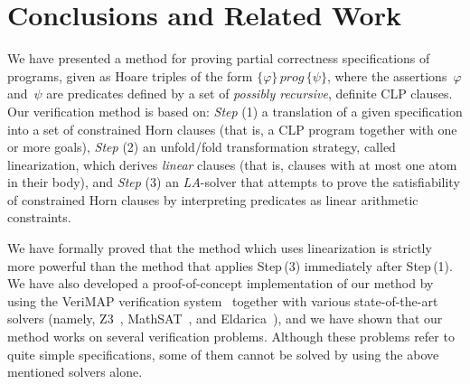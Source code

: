 \documentclass[english]{tlp}
\begin{document}
\begin{table}[ht]
\begin{tabular}
\end{tabular}\vspace{0mm}

\caption{Columns\/ {\rm RI} and {\rm LIN} show the times $($in seconds$)$
 taken for removal of the interpreter and linearization. 
The two columns under \mbox{{\it LA}-{\rm solving-1}} show the times taken by {\rm Z3} and {\rm \hspace{.5mm}Eldarica} for solving the problems after {\rm RI} alone.
The three columns under \mbox{{\it LA}-{\rm solving-2}} show the times taken 
by \mbox{\rm VeriMAP} together with {\rm Z3}, {\rm MathSAT}, {\rm \hspace{.5mm}and Eldarica},  after {\rm RI} and {\rm LIN}.
The timeout TO occurs after $120$ seconds.
\label{tab:expres}}
\end{table}



\section{Conclusions and Related Work}
\label{sec:conclusions}


We have presented a method for proving partial correctness specifications
of programs, given as Hoare triples of the form $\{\varphi\}\, \textit{prog}\, \{\psi\}$,
where the assertions~$\varphi $ and~$\psi$ are predicates
defined by a set of {\it possibly recursive}, definite CLP clauses.
Our verification method is based on: 
{\it{ Step}} (1) a translation of a given
specification into a set of constrained 
Horn clauses (that is, a CLP program together with one or more goals), 
{\it{Step}} (2)  an unfold/fold transformation strategy, 
called {\rm linearization}, which
derives {\it linear} clauses (that is, clauses with at most 
one atom in their body), and
{\it{Step}} (3) an {\it LA}-solver that attempts to prove the 
satisfiability of constrained Horn clauses
by interpreting predicates as linear arithmetic constraints.


We have formally proved that the method {which uses} {\rm linearization} 
is strictly more
powerful than the method that applies Step\,(3) immediately after Step\,(1).
We have also developed a proof-of-concept implementation of our method 
by using the VeriMAP verification system~\cite{De&14b} together with 
various state-of-the-art solvers
(namely, Z3~\cite{DeB08}, MathSAT~\cite{MaS13}, and Eldarica~\cite{Ru&13}), and we 
have shown that our method works on several verification problems.
Although these problems refer to
quite simple specifications, some of them cannot be solved by {using the above mentioned solvers alone.}
\end{document}
